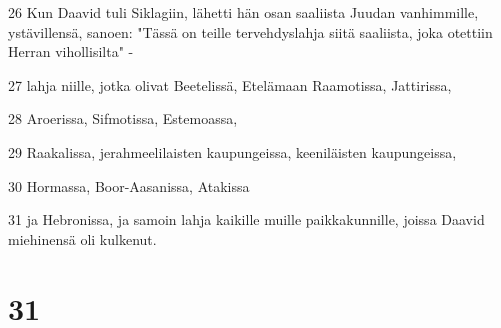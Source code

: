 \par 26 Kun Daavid tuli Siklagiin, lähetti hän osan saaliista Juudan vanhimmille, ystävillensä, sanoen: "Tässä on teille tervehdyslahja siitä saaliista, joka otettiin Herran vihollisilta" -
\par 27 lahja niille, jotka olivat Beetelissä, Etelämaan Raamotissa, Jattirissa,
\par 28 Aroerissa, Sifmotissa, Estemoassa,
\par 29 Raakalissa, jerahmeelilaisten kaupungeissa, keeniläisten kaupungeissa,
\par 30 Hormassa, Boor-Aasanissa, Atakissa
\par 31 ja Hebronissa, ja samoin lahja kaikille muille paikkakunnille, joissa Daavid miehinensä oli kulkenut.

\chapter{31}

